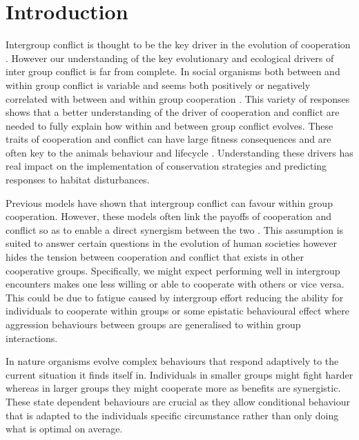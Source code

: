 \section{Introduction}

Intergroup conflict is thought to be the key driver in the evolution of cooperation \cite{radfordWithingroupBehavioural2016,kappelerMindGap2010,barkerWithingroupCompetition2012}. 
However our understanding of the key evolutionary and ecological drivers of inter group conflict is far from complete. 
In social organisms both between and within group conflict is variable and seems both positively or negatively correlated with between and within group cooperation \citep{radfordWithingroupBehavioural2016}. 
This variety of responses shows that a better understanding of the driver of cooperation and conflict are needed to fully explain how within and between group conflict evolves. 
These traits of cooperation and conflict can have large fitness consequences and are often key to the animals behaviour and lifecycle \citep{thompsonCausesConsequences2017,vitikainenLiveLong2019}. Understanding these drivers has real impact on the implementation of conservation strategies and predicting responses to habitat disturbances. 

Previous models have shown that intergroup conflict can favour within group cooperation. 
However, these models often link the payoffs of cooperation and conflict so as to enable a direct synergism between the two \citep{choiCoevolutionParochial2007,lehmannWarEvolution2008a}. 
This assumption is suited to answer certain questions in the evolution of human societies however hides the tension between cooperation and conflict that exists in other cooperative groups. 
Specifically, we might expect performing well in intergroup encounters makes one less willing or able to cooperate with others or vice versa. 
This could be due to fatigue caused by intergroup effort reducing the ability for individuals to cooperate within groups or some epistatic behavioural effect where aggression behaviours between groups are generalised to within group interactions.

In nature organisms evolve complex behaviours that respond adaptively to the current situation it finds itself in. Individuals in smaller groups might fight harder whereas in larger groups they might cooperate more as benefits are synergistic. 
These state dependent behaviours are crucial as they allow conditional behaviour that is adapted to the individuals specific circumstance rather than only doing what is optimal on average. 


